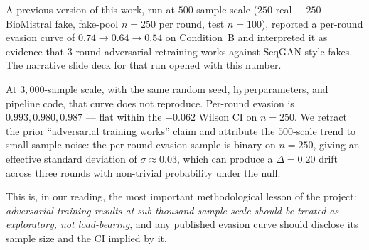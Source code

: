 A previous version of this work, run at \(500\)-sample scale
(\(250\) real \(+\) \(250\) BioMistral fake, fake-pool
\(n = 250\) per round, test \(n = 100\)), reported a per-round
evasion curve of \(0.74 \to 0.64 \to 0.54\) on Condition~B and
interpreted it as evidence that 3-round adversarial retraining works
against SeqGAN-style fakes. The narrative slide deck for that run
opened with this number.

At \(3{,}000\)-sample scale, with the same
random seed, hyperparameters, and pipeline code, that curve does not
reproduce. Per-round evasion is \(0.993, 0.980, 0.987\) — flat within
the \(\pm 0.062\) Wilson CI on \(n = 250\). We retract the prior
``adversarial training works'' claim and attribute the \(500\)-scale
trend to small-sample noise: the per-round evasion sample is binary on
\(n = 250\), giving an effective standard deviation of
\(\sigma \approx 0.03\), which can produce a \(\Delta = 0.20\) drift
across three rounds with non-trivial probability under the null.

This is, in our reading, the most important methodological lesson of
the project: \emph{adversarial training results at sub-thousand sample
scale should be treated as exploratory, not load-bearing}, and any
published evasion curve should disclose its sample size and the CI
implied by it.
